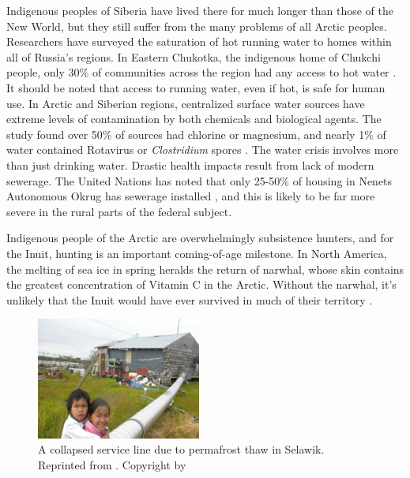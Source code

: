 \documentclass[american]{../../../coursework}
\begin{document}
Indigenous peoples of Siberia have lived there for much longer than those of
the New World, but they still suffer from the many problems of all Arctic
peoples. Researchers have surveyed the saturation of hot running water to
homes within all of Russia's regions. In Eastern Chukotka, the indigenous home
of Chukchi people, only 30\% of communities across the region had any access
to hot water \parencite{Hennessy2016}. It should be noted that access to
running water, even if hot, is safe for human use. In Arctic and Siberian
regions, centralized surface water sources have extreme levels of
contamination by both chemicals and biological agents. The study found over
50\% of sources had chlorine or magnesium, and nearly 1\% of water contained
Rotavirus or \emph{Clostridium} spores \parencite{Dudarev2013}. The water
crisis involves more than just drinking water. Drastic health impacts result
from lack of modern sewerage. The United Nations has noted that only 25-50\%
of housing in Nenets Autonomous Okrug has sewerage installed \parencite{2007},
and this is likely to be far more severe in the rural parts of the federal
subject.

Indigenous people of the Arctic are overwhelmingly subsistence hunters, and
for the Inuit, hunting is an important coming-of-age milestone. In North
America, the melting of sea ice in spring heralds the return of narwhal, whose
skin contains the greatest concentration of Vitamin C in the Arctic. Without
the narwhal, it's unlikely that the Inuit would have ever survived in much of
their territory \parencite{Brown2011}.

\begin{figure}
    \begin{center}
        \includegraphics[width=0.48\textwidth]{arctic_photo.png}
    \end{center}
    \caption{A collapsed service line due to permafrost thaw in Selawik.
    Reprinted from . Copyright \citeyear{Brubaker2016}
    by \citeauthor{Brubaker2016}}%
    \label{fig:photo}
\end{figure}
\end{document}
